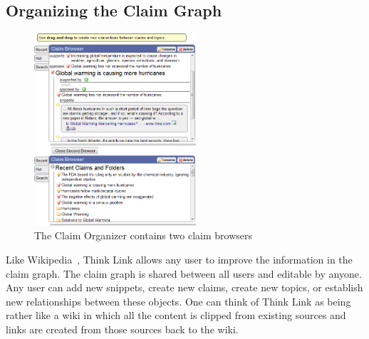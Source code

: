 \documentclass{chi2009}
\begin{document}
% 
% 





\subsection{Organizing the Claim Graph}

\begin{figure}[tb]
	\begin{center}
	\includegraphics[width=6cm]{../screenshots/claimbrowse.png}
	\caption{The Claim Organizer contains two claim browsers}
	\label{fig:claimbrowser}
	\end{center}
\end{figure}

Like Wikipedia~\cite{wikipedia}, Think Link allows any user to improve the information in the claim graph. The claim graph is shared between all users and editable by anyone. Any user can add new snippets, create new claims, create new topics, or establish new relationships between these objects. One can think of Think Link as being rather like a wiki in which all the content is clipped from existing sources and links are created from those sources back to the wiki.
\end{document}
